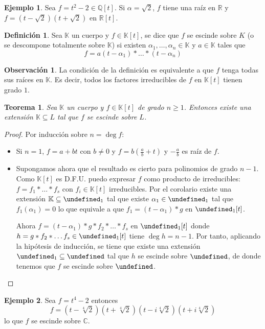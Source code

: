 \documentclass[10pt, spanish]{report}
\newtheorem*{tma}{Teorema}
\theoremstyle{definition}
\newtheorem*{defin}{Definición}
\newtheorem*{ej}{Ejemplo}
\newtheorem*{obs}{Observación}
\newcommand{\Q}{\mathbb{Q}}
\newcommand{\R}{\mathbb{R}}
\newcommand{\C}{\mathbb{C}}
\newcommand{\K}{\mathbb{K}}
\let\L\undefined
\newcommand{\L}{\mathbb{L}}
\renewcommand{\geq}{\geqslant}
\begin{document}
\begin{ej}
    Sea $f=t^2-2\in \Q[t]$. Si $\alpha=\sqrt{2}$, $f$  tiene una raíz en $\R$ y
    $f=(t-\sqrt{2})(t+\sqrt{2})$ en $\R[t]$.
\end{ej}
\begin{defin}
    Sea $\K$ un cuerpo y $f\in\K[t]$, se dice que $f$ se escinde sobre $K$ (o se
    descompone totalmente sobre $\K$) si existen $\alpha_1,\ldots,\alpha_n\in\K$
    y $a\in\K$ tales que
    \[f=a(t-\alpha_1)*\ldots*(t-\alpha_n)\]
\end{defin}
\begin{obs}
    La condición de la definición es equivalente a que $f$ tenga todas sus
    raíces en $\K$. Es decir, todos los factores irreducibles de $f$ en $\K[t]$
    tienen grado $1$.
\end{obs}
\begin{tma}
    Sea $\K$ un cuerpo y $f\in\K[t]$ de grado $n\geq1$. Entonces existe una
    extensión $\K\subseteq L$ tal que $f$ se escinde sobre $L$.
\end{tma}
\begin{proof}
    Por inducción sobre $n=\deg{f}$:
    \begin{itemize}
        \item Si $n=1$, $f=a+bt$ con $b\neq 0$ y $f=b(\frac{a}{b}+t)$ y
            $-\frac{a}{b}$ es raíz de $f$.
        \item Supongamos ahora que el resultado es cierto para polinomios de
            grado $n-1$. Como $\K[t]$ es D.F.U. puedo expresar $f$
            como producto de irreducibles: $f=f_1*\ldots*f_s$ con $f_i\in\K[t]$
            irreducibles. Por el corolario existe una extensión $\K\subseteq\L_1$
            tal que existe $\alpha_1\in\L_1$ tal que $f_1(\alpha_1)=0$ lo que
            equivale a que $f_1=(t-\alpha_1)*g$ en $\L_1[t]$.

            Ahora $f=(t-\alpha_1)*g*f_2*\ldots*f_s$ en $\L_1[t]$ donde
            $h=g*f_2*\ldots f_s\in\L_1[t]$ tiene $\deg{h}=n-1$. Por tanto,
            aplicando la hipótesis de inducción, se tiene que existe una
            extensión $\L_1\subseteq\L$ tal que $h$ se escinde sobre $\L$, de
            donde tenemos que $f$ se escinde sobre $\L$.
    \end{itemize}
\end{proof}
\begin{ej}
    Sea $f=t^4-2$ entonces
    \[f=(t-\sqrt[4]{2})(t+\sqrt[4]{2})(t-i\sqrt[4]{2})(t+i\sqrt[4]{2})\]
    lo que $f$ se escinde sobre $\C$.
\end{ej}
\end{document}
